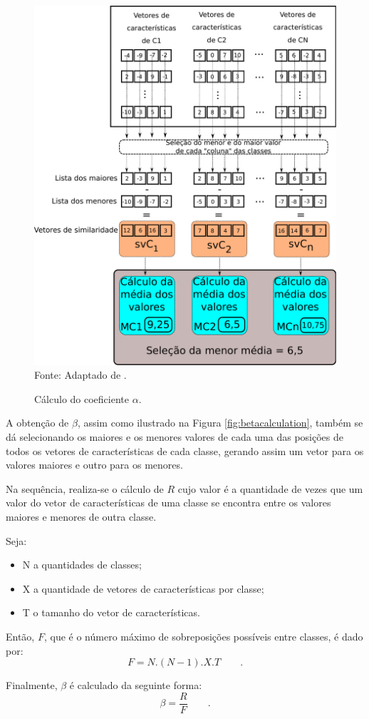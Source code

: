 			\begin{figure}[h]
				\centering
				\caption{Cálculo do coeficiente $\alpha$.}
				\includegraphics[width=0.5\linewidth]{images/calculoAlpha.pdf}
				\label{fig:calculoalpha}
				\\Fonte: Adaptado de \cite{8588433}.
			\end{figure}
			
			\par A obtenção de $\beta$, assim como ilustrado na Figura \ref{fig:betacalculation}, também se dá selecionando os maiores e os menores valores de cada uma das posições de todos os vetores de características de cada classe, gerando assim um vetor para os valores maiores e outro para os menores.
			
			\par Na sequência, realiza-se o cálculo de $R$ cujo valor é a quantidade de vezes que um valor do vetor de características de uma classe se encontra entre os valores maiores e menores de outra classe.
			
			\par Seja:
			\begin{itemize}
				\item N a quantidades de classes;
				\item X a quantidade de vetores de características por classe;
				\item T o tamanho do vetor de características.
			\end{itemize}
			
			\par Então, $F$, que é o número máximo de sobreposições possíveis entre classes, é dado por:
			\begin{equation}
				F=N.(N-1).X.T \qquad.
			\end{equation}
			\par Finalmente, $\beta$ é calculado da seguinte forma:
			\begin{equation}
				\beta=\dfrac{R}{F} \qquad.
			\end{equation}
	

